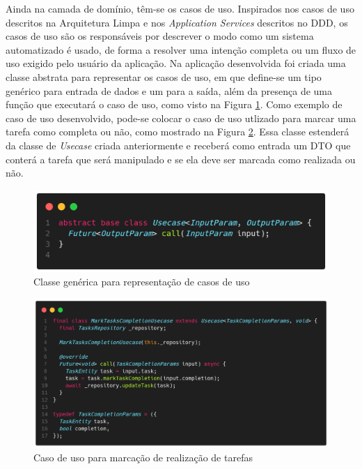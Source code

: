 \documentclass[12pt, %
openright, 
oneside, %
a4paper,    %
brazil]{facom-ufu-abntex2}
\begin{document}
Ainda na camada de domínio, têm-se os casos de uso. Inspirados nos casos de uso descritos na Arquitetura Limpa e nos \textit{Application Services} descritos no DDD, os casos de uso são os responsáveis por descrever o modo como um sistema automatizado é usado, de forma a resolver uma intenção completa ou um fluxo de uso exigido pelo usuário da aplicação. Na aplicação desenvolvida foi criada uma classe abstrata para representar os casos de uso, em que define-se um tipo genérico para entrada de dados e um para a saída, além da presença de uma função que executará o caso de uso, como visto na Figura \ref{fig:usecase_interface}. Como exemplo de caso de uso desenvolvido, pode-se colocar o caso de uso utlizado para marcar uma tarefa como completa ou não, como mostrado na Figura \ref{fig:mark_task_completion_usecase}. Essa classe estenderá da classe de \textit{Usecase} criada anteriormente e receberá como entrada um DTO que conterá a tarefa que será manipulado e se ela deve ser marcada como realizada ou não.

\begin{figure}[ht]
    \centering
    \includegraphics[width=.65\textwidth, trim={0 30 0 100}, clip]{figures/arch/usecase_interface.png}
    \caption{Classe genérica para representação de casos de uso}
    \label{fig:usecase_interface}
\end{figure}


\begin{figure}[ht]
    \centering
    \includegraphics[width=.65\textwidth, trim={0 30 0 100}, clip]{figures/arch/mark_task_completion_usecase.png}
    \caption{Caso de uso para marcação de realização de tarefas}
    \label{fig:mark_task_completion_usecase}
\end{figure}
\end{document}

